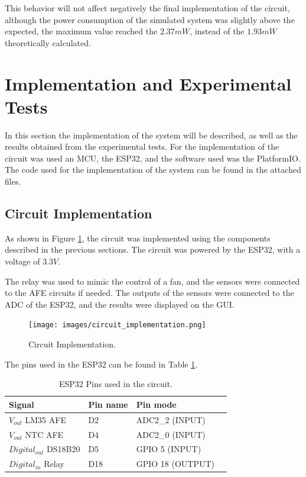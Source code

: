 \documentclass[12pt]{article}
\begin{document}
    This behavior will not affect negatively the final implementation of the circuit, although the power consumption of the simulated system was slightly above the expected, the maximum value reached the $2.37mW$, instead of the $1.93mW$ theoretically calculated.
    
\section{Implementation and Experimental Tests}

In this section the implementation of the system will be described, as well as the results obtained from the experimental tests. For the implementation of the circuit was used an MCU, the ESP32, and the software used was the PlatformIO. The code used for the implementation of the system can be found in the attached files.

\subsection{Circuit Implementation}

As shown in  Figure \ref{fig:circuit-implementation}, the circuit was implemented using the components described in the previous sections. The circuit was powered by the ESP32, with a voltage of $3.3V$. 

The relay was used to mimic the control of a fan, and the sensors were connected to the AFE circuits if needed. The outputs of the sensors were connected to the ADC of the ESP32, and the results were displayed on the GUI.
\begin{figure}[H] 
    \centering
    \texttt{[image: images/circuit\_implementation.png]}
    \caption{Circuit Implementation.}
    \label{fig:circuit-implementation}
\end{figure}

The pins used in the ESP32 can be found in Table \ref{tab:pins}.


\begin{table}[h]
    \centering
    \caption{ESP32 Pins used in the circuit.}
    \begin{tabularx}{\textwidth}{>{\centering\arraybackslash}X >{\centering\arraybackslash}X >{\centering\arraybackslash}X >{\centering\arraybackslash}X}
        \toprule
        \textbf{Signal} & \textbf{Pin name} & \textbf{Pin mode}\\
        \midrule
        $V_{out}$ LM35 AFE & D2 & ADC2\_2 (INPUT)\\
        \midrule
        $V_{out}$ NTC AFE & D4 & ADC2\_0 (INPUT)\\
        \midrule
        $Digital_{out}$ DS18B20 & D5 & GPIO 5 (INPUT)\\
        \midrule
        $Digital_{in}$ Relay & D18 & GPIO 18 (OUTPUT)\\
        \bottomrule
    \end{tabularx}
    \label{tab:pins}
\end{table}
\end{document}
